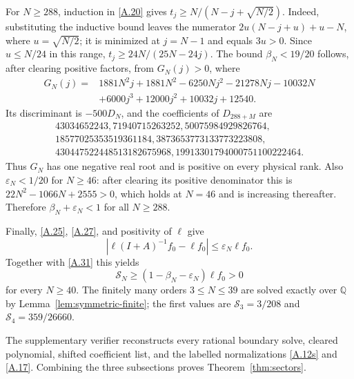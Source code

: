 For $N\ge288$, induction in \eqref{A.20} gives
$t_j\ge N/(N-j+\sqrt{N/2})$.  Indeed, substituting the inductive bound leaves
the numerator
$2u(N-j+u)+u-N$, where $u=\sqrt{N/2}$; it is minimized at $j=N-1$ and
equals $3u>0$.  Since $u\le N/24$ in this range,
$t_j\ge24N/(25N-24j)$.  The bound
$\beta_N<19/20$ follows, after clearing positive factors, from
$G_N(j)>0$, where
\[
\begin{aligned}
G_N(j)={}&1881N^2j+1881N^2-6250Nj^2-21278Nj-10032N\\
         &+6000j^3+12000j^2+10032j+12540.
\end{aligned}                                               \tag{A.34}\label{A.34}
\]
Its discriminant is $-500D_N$, and the coefficients of $D_{288+M}$ are
\[
\begin{gathered}
43034652243,71940715263252,50075984929826764,\\
18577025353519361184,3873653773133773223808,\\
430447522448513182675968,
19913301794000751100222464.
\end{gathered}                                             \tag{A.35}\label{A.35}
\]
Thus $G_N$ has one negative real root and is positive on every physical
rank.  Also $\varepsilon_N<1/20$ for $N\ge46$: after clearing its positive
denominator this is $22N^2-1066N+2555>0$, which holds at $N=46$ and is
increasing thereafter.  Therefore
$\beta_N+\varepsilon_N<1$ for all $N\ge288$.

Finally, \eqref{A.25}, \eqref{A.27}, and positivity of $\ell$ give
\[
 \left|\ell(I+A)^{-1}f_0-\ell f_0\right|
 \le\varepsilon_N\ell f_0.
\]
Together with \eqref{A.31} this yields
\[
 \mathcal S_N\ge(1-\beta_N-\varepsilon_N)\ell f_0>0       \tag{A.36}\label{A.36}
\]
for every $N\ge40$.  The finitely many orders $3\le N\le39$ are solved
exactly over $\mathbb Q$ by Lemma~\ref{lem:symmetric-finite}; the first values are
$\mathcal S_3=3/208$ and $\mathcal S_4=359/26660$.

The supplementary verifier reconstructs every rational boundary solve,
cleared polynomial, shifted coefficient list, and the labelled
normalizations \eqref{A.12s} and \eqref{A.17}.  Combining the three
subsections proves Theorem~\ref{thm:sectors}.
